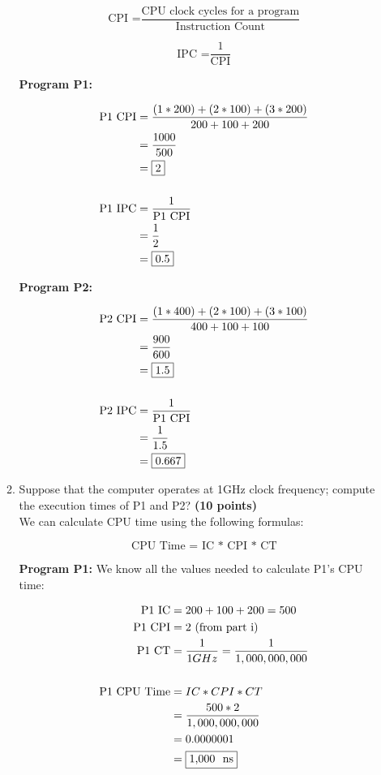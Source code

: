 \documentclass[a4paper, 15pt]{exam}
\begin{document}
\begin{enumerate}
\begin{enumerate}
$$\text{CPI =}\frac{\text{CPU clock cycles for a program}}{\text{Instruction Count}}$$

$$\text{IPC =}\frac{1}{\text{CPI}}$$

\textbf{Program P1:} 

\begin{align*} 
   			\text{P1 CPI} &= \frac{(1 * 200) + (2 * 100) + (3 * 200)}{200 + 100 + 200} \\
   			&= \frac{1000}{500} \\
   			&= \fbox{2} \\ \\
   			\text{P1 IPC} &= \frac{1}{\text{P1 CPI}} \\
   			&= \frac{1}{2} \\
   			&= \fbox{0.5}
   	\end{align*}
   	
   	\textbf{Program P2:} 

\begin{align*} 
   			\text{P2 CPI} &= \frac{(1 * 400) + (2 * 100) + (3 * 100)}{400 + 100 + 100} \\
   			&= \frac{900}{600} \\
   			&= \fbox{1.5} \\ \\
   			\text{P2 IPC} &= \frac{1}{\text{P1 CPI}} \\
   			&= \frac{1}{1.5} \\
   			&= \fbox{0.667}
   	\end{align*}
   	
\item Suppose that the computer operates at 1GHz clock frequency; compute the execution times of P1 and P2? 
 \textbf {(10 points)} \\
We can calculate CPU time using the following formulas:

$$\text{CPU Time = IC * CPI * CT}$$

\textbf{Program P1:} We know all the values needed to calculate P1's CPU time:

\begin{align*} 
   			\text{P1 IC} &= 200 + 100 + 200 = 500 \\
   			\text{P1 CPI} &= 2 \text{ (from part i)} \\
   			\text{P1 CT} &= \frac{1}{1 GHz} = \frac{1}{1,000,000,000} \\ \\
   			\text{P1 CPU Time} &= IC * CPI * CT \\
   			&= \frac{500 * 2}{1,000,000,000} \\
   			&= 0.0000001 \\
   			&= \fbox{1,000 \ ns}
   	\end{align*}


\end{enumerate}
\end{enumerate}
\end{document}
